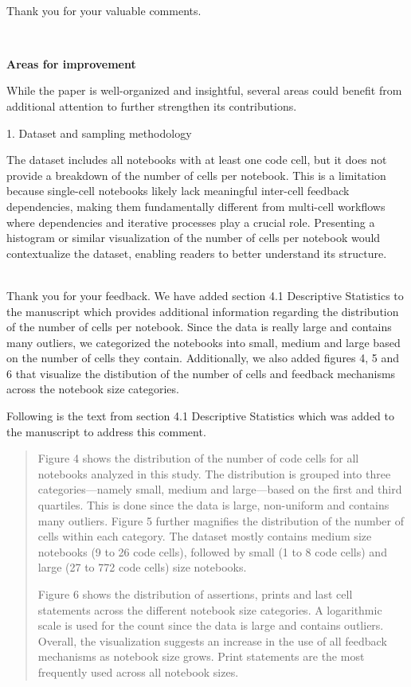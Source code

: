 \documentclass[11pt,fleqn]{article}
\newcommand{\eline}{\vspace*{.75\baselineskip}}
\newcommand{\Referee}[1]{\eline \noindent {\bf Reviewer comment #1:} \\}
\newcommand{\Us}{\eline \noindent {\bf Response:}\\}
\newenvironment{revcomment}[1][]
{\Referee{#1}\begin{rcomment}}
{\end{rcomment}}
\begin{document}
\Us Thank you for your valuable comments.

\begin{revcomment}[2.3]
  \textbf{Areas for improvement}

  While the paper is well-organized and insightful, several areas could benefit from additional attention to further strengthen its contributions.

  1. Dataset and sampling methodology

  The dataset includes all notebooks with at least one code cell, but it does not provide a breakdown of the number of cells per notebook. This is a limitation because single-cell notebooks likely lack meaningful inter-cell feedback dependencies, making them fundamentally different from multi-cell workflows where dependencies and iterative processes play a crucial role. Presenting a histogram or similar visualization of the number of cells per notebook would contextualize the dataset, enabling readers to better understand its structure.
\end{revcomment}

\Us Thank you for your feedback. We have added section 4.1 Descriptive Statistics to the manuscript which provides additional information regarding the distribution of the number of cells per notebook. Since the data is really large and contains many outliers, we categorized the notebooks into small, medium and large based on the number of cells they contain. Additionally, we also added figures 4, 5 and 6 that visualize the distibution of the number of cells and feedback mechanisms across the notebook size categories.

Following is the text from section 4.1 Descriptive Statistics which was added to the manuscript to address this comment.

\begin{quote}
  Figure 4 shows the distribution of the number of code cells for all notebooks analyzed in this study. The distribution is grouped into three categories---namely small, medium and large---based on the first and third quartiles. This is done since the data is large, non-uniform and contains many outliers. Figure 5 further magnifies the distribution of the number of cells within each category. The dataset mostly contains medium size notebooks (9 to 26 code cells), followed by small (1 to 8 code cells) and large (27 to 772 code cells) size notebooks.

  Figure 6 shows the distribution of assertions, prints and last cell statements across the different notebook size categories. A logarithmic scale is used for the count since the data is large and contains outliers. Overall, the visualization suggests an increase in the use of all feedback mechanisms as notebook size grows. Print statements are the most frequently used across all notebook sizes.
\end{quote}
\end{document}
